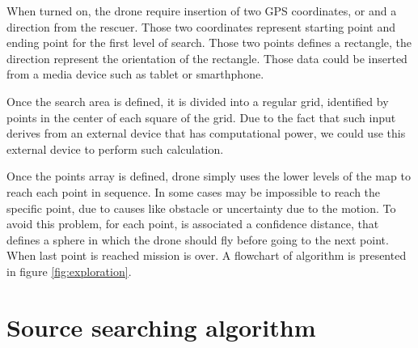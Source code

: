 \begin{figure*}[p]
\end{figure*}

When turned on, the drone require insertion of two GPS coordinates, or  and a direction from the rescuer. Those two coordinates represent starting point and ending point for the first level of search. Those two points defines a rectangle, the direction represent the orientation of the rectangle. Those data could be inserted from a media device such as tablet or smarthphone.

Once the search area is defined, it is divided into a regular grid, identified by points in the center of each square of the grid. Due to the fact that such input derives from an external device that has computational power, we could use this external device to perform such calculation.

Once the points array is defined, drone simply uses the lower levels of the map to reach each point in sequence. In some cases may be impossible to reach the specific point, due to causes like obstacle or uncertainty due to the motion. To avoid this problem, for each point, is associated a confidence distance, that defines a sphere in which the drone should fly before going to the next point. When last point is reached mission is over. A flowchart of algorithm is presented in figure \ref{fig:exploration}.


\section{Source searching algorithm}

